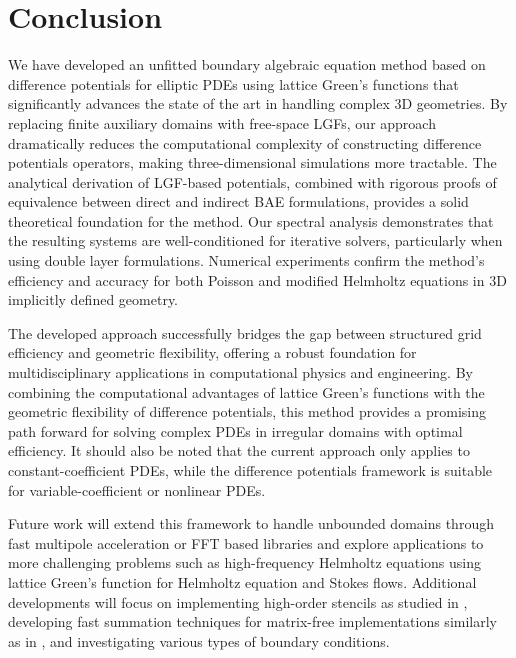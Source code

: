 \section{Conclusion}\label{sec:conclusion}

We have developed an unfitted boundary algebraic equation method based on difference potentials for elliptic PDEs using lattice Green's functions that significantly advances the state of the art in handling complex 3D geometries. By replacing finite auxiliary domains with free-space LGFs, our approach dramatically reduces the computational complexity of constructing difference potentials operators, making three-dimensional simulations more tractable. The analytical derivation of LGF-based potentials, combined with rigorous proofs of equivalence between direct and indirect BAE formulations, provides a solid theoretical foundation for the method. Our spectral analysis demonstrates that the resulting systems are well-conditioned for iterative solvers, particularly when using double layer formulations. Numerical experiments confirm the method's efficiency and accuracy for both Poisson and modified Helmholtz equations in 3D implicitly defined geometry.

The developed approach successfully bridges the gap between structured grid efficiency and geometric flexibility, offering a robust foundation for multidisciplinary applications in computational physics and engineering. By combining the computational advantages of lattice Green's functions with the geometric flexibility of difference potentials, this method provides a promising path forward for solving complex PDEs in irregular domains with optimal efficiency. It should also be noted that the current approach only applies to constant-coefficient PDEs, while the difference potentials framework is suitable for variable-coefficient or nonlinear PDEs.

Future work will extend this framework to handle unbounded domains through fast multipole acceleration or FFT based libraries \cite{caprace2021flups} and explore applications to more challenging problems such as high-frequency Helmholtz equations using lattice Green's function for Helmholtz equation \cite{beylkin2009fast,beylkin2008fast,linton2010lattice} and Stokes flows. Additional developments will focus on implementing high-order stencils as studied in \cite{gabbard2024lattice}, developing fast summation techniques for matrix-free implementations similarly as in \cite{gillman2014fast}, and investigating various types of boundary conditions. 